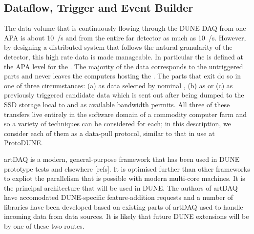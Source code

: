 
\subsection{Dataflow, Trigger and Event Builder}
\label{sec:fd-daq-hlt}


The data volume that is continuously flowing through the DUNE
  DAQ from one APA is about \SI{10}{\GB/\s}
and from the entire far detector as much as \SI{10}{\TB/\s}.
However, by designing a distributed system that follows the natural
granularity of the detector, this high rate data is made manageable.
In particular the  is defined at the APA level for
the  .
The majority of the data corresponds to the untriggered parts and
never leaves the computers hosting the .
The parts that exit do so in one of three circumstances: (a) as data
selected by nominal , (b) as  or
(c) as previously triggered  candidate data which is
sent out after being dumped to the SSD storage local to
 and as available bandwidth permits. 
All three of these transfers live entirely in the software domain of a
commodity computer farm and so a variety of techniques can be
considered for each; in this description, we consider each of them as
a data-pull protocol, similar to that in use at ProtoDUNE.


artDAQ is a modern, general-purpose framework that has been used in
DUNE prototype tests and elsewhere [refs]. 
It is optimised further than other frameworks to expliot the
parallelism that is possible with modern multi-core machines. 
It is the principal architecture that will be used in DUNE.
The authors of artDAQ have accomodated DUNE-specific feature-addition
requests and a number of libraries have been developed based on
existing parts of artDAQ used to handle incoming data from data
sources. 
It is likely that future DUNE extensions will be by one of these two
routes.

